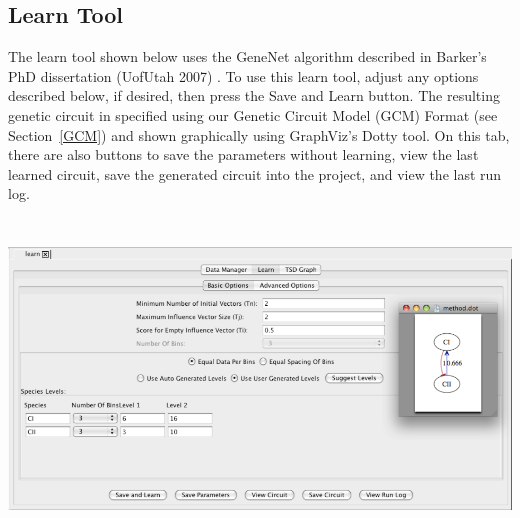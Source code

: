 \documentclass[titlepage,11pt]{article}
\begin{document}
\clearpage

\subsection{\label{learnTool}Learn Tool}

\noindent
The learn tool shown below uses the GeneNet algorithm described in
Barker's PhD dissertation (UofUtah 2007)
. To use this learn tool, adjust
any options described below, if desired, then press the Save and
Learn button. The resulting genetic circuit in specified using
our Genetic Circuit Model (GCM) Format (see Section~\ref{GCM}) and shown
graphically using GraphViz's Dotty tool. On this tab, there are also 
buttons to save the parameters without learning, view the last learned 
circuit, save the generated circuit into the project, and view the last run
log. 
\begin{center}
\includegraphics[height=85mm]{screenshots/learn}
\end{center}
\end{document}

